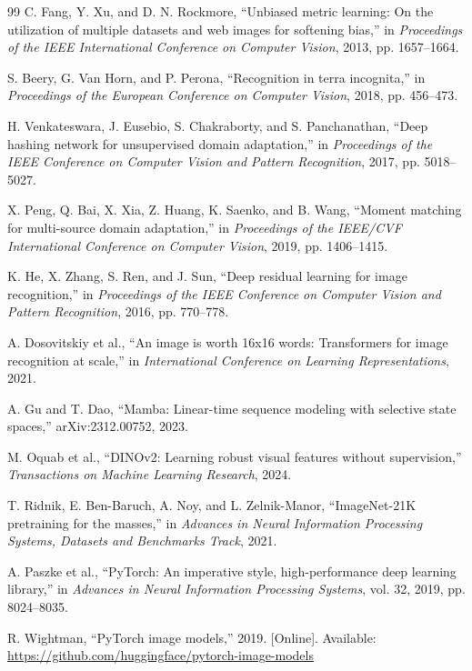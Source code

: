 \documentclass[11pt,a4paper]{article}
\begin{document}
\begin{thebibliography}{99}
C. Fang, Y. Xu, and D. N. Rockmore,
``Unbiased metric learning: On the utilization of multiple datasets and web images for softening bias,''
in \emph{Proceedings of the IEEE International Conference on Computer Vision}, 2013, pp. 1657--1664.

S. Beery, G. Van Horn, and P. Perona,
``Recognition in terra incognita,''
in \emph{Proceedings of the European Conference on Computer Vision}, 2018, pp. 456--473.

H. Venkateswara, J. Eusebio, S. Chakraborty, and S. Panchanathan,
``Deep hashing network for unsupervised domain adaptation,''
in \emph{Proceedings of the IEEE Conference on Computer Vision and Pattern Recognition}, 2017, pp. 5018--5027.

X. Peng, Q. Bai, X. Xia, Z. Huang, K. Saenko, and B. Wang,
``Moment matching for multi-source domain adaptation,''
in \emph{Proceedings of the IEEE/CVF International Conference on Computer Vision}, 2019, pp. 1406--1415.

K. He, X. Zhang, S. Ren, and J. Sun,
``Deep residual learning for image recognition,''
in \emph{Proceedings of the IEEE Conference on Computer Vision and Pattern Recognition}, 2016, pp. 770--778.

A. Dosovitskiy et al.,
``An image is worth 16x16 words: Transformers for image recognition at scale,''
in \emph{International Conference on Learning Representations}, 2021.

A. Gu and T. Dao,
``Mamba: Linear-time sequence modeling with selective state spaces,'' arXiv:2312.00752, 2023.

M. Oquab et al.,
``DINOv2: Learning robust visual features without supervision,''
\emph{Transactions on Machine Learning Research}, 2024.

T. Ridnik, E. Ben-Baruch, A. Noy, and L. Zelnik-Manor,
``ImageNet-21K pretraining for the masses,''
in \emph{Advances in Neural Information Processing Systems, Datasets and Benchmarks Track}, 2021.

A. Paszke et al.,
``PyTorch: An imperative style, high-performance deep learning library,''
in \emph{Advances in Neural Information Processing Systems}, vol. 32, 2019, pp. 8024--8035.

R. Wightman, ``PyTorch image models,'' 2019. [Online]. Available: \url{https://github.com/huggingface/pytorch-image-models}


\end{thebibliography}
\end{document}
